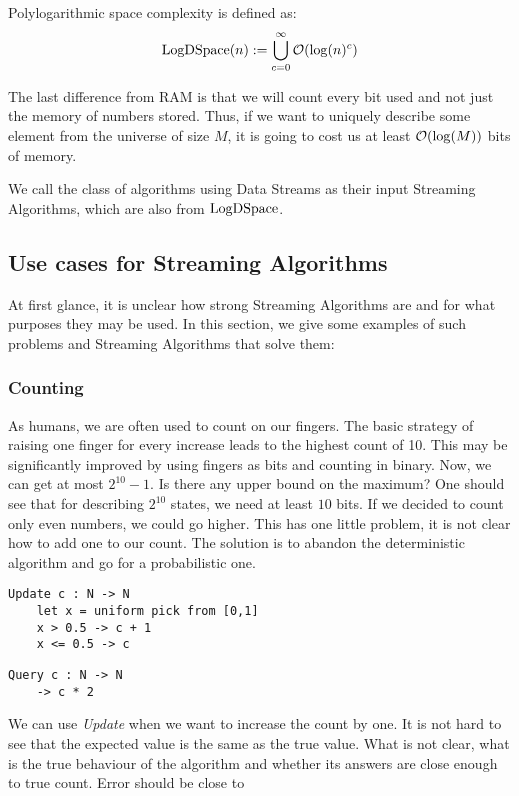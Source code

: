 \begin{defn}
    Polylogarithmic space complexity is defined as: 
    \[ \mathrm{LogDSpace}(n):=  \bigcup_{c=0}^{\infty}\mathcal{O}(\log(n)^c) \]
\end{defn}


The last difference from RAM is that we will count every bit used and not just the memory of numbers stored. Thus, if we want to uniquely describe some element from the universe of size \(M\), it is going to cost us at least \(\mathcal{O}(\log(M))\) bits of memory.

We call the class of algorithms using Data Streams as their input Streaming Algorithms, which are also from $\mathrm{LogDSpace}$.

\subsection{Use cases for Streaming Algorithms}

At first glance, it is unclear how strong Streaming Algorithms are and for what purposes they may be used. In this section, we give some examples of such problems and Streaming Algorithms that solve them: 

\subsubsection{Counting}
As humans, we are often used to count on our fingers. The basic strategy of raising one finger for every increase leads to the highest count of 10. This may be significantly improved by using fingers as bits and counting in binary. Now, we can get at most $2^{10} - 1$. Is there any upper bound on the maximum?
One should see that for describing $2^{10}$ states, we need at least $10$ bits.
If we decided to count only even numbers, we could go higher. This has one little problem, it is not clear how to add one to our count. The solution is to abandon the deterministic algorithm and go for a probabilistic one.  

\begin{lstlisting}
Update c : N -> N
    let x = uniform pick from [0,1]
    x > 0.5 -> c + 1
    x <= 0.5 -> c
\end{lstlisting}

\begin{lstlisting}
Query c : N -> N
    -> c * 2
\end{lstlisting}

We can use \textit{Update} when we want to increase the count by one. It is not hard to see that the expected value is the same as the true value. What is not clear, what is the true behaviour of the algorithm and whether its answers are close enough to true count. Error should be close to 

